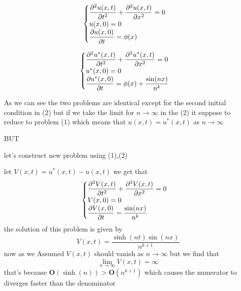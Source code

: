 \documentclass[]{article}
\begin{document}
\begin{minipage}{.5\textwidth}
        \begin{equation}
                \begin{cases}
                        \displaystyle \pdv[2]{u(x,t)}{t} + \pdv[2]{u(x,t)}{x} = 0
                        \\
                        u(x,0) = 0
                        \\
                        \displaystyle \pdv{u(x,0)}{t} = \phi(x)
                \end{cases}        
        \end{equation}
\end{minipage}
\begin{minipage}{.5\textwidth}
        \begin{equation}
                \begin{cases}
                        \displaystyle \pdv[2]{u^{*}(x,t)}{t} + \pdv[2]{u^{*}(x,t)}{x} = 0
                        \\
                        u^{*}(x,0) = 0
                        \\
                        \displaystyle \pdv{u^{*}(x,0)}{t} = \phi(x) + \frac{\sin(nx)}{n^{k}}
                \end{cases}               
        \end{equation}
\end{minipage}


As we can see the two problems are identical except for the second initial condition in (2) but if we take the 
limit for $n \to \infty$ in the (2) it suppose to reduce to problem (1) which means that $u(x,t) = u^{*}(x,t)$ as $n \to \infty$

BUT

let's construct new problem using (1),(2)

let $V(x,t) = u^{*}(x,t) - u(x,t)$ we get that 
\begin{equation}
        \begin{cases}
                \displaystyle \pdv[2]{V(x,t)}{t} + \pdv[2]{V(x,t)}{x} = 0
                \\
                V(x,0) = 0
                \\
                \displaystyle \pdv{V(x,0)}{t} =\frac{\sin(nx)}{n^{k}}
        \end{cases}               
\end{equation}
the solution of this problem is given by 
\[
V(x,t) = \frac{\sinh(nt)\sin(nx)}{n^{k+1}}
\]
now as we Assumed $V(x,t)$ should vanish as $n \to \infty$ but we find that 
\[
\lim_{n \to \infty} V(x,t) = \infty
\]
that's because $\mathbf{O}(\sinh(n)) > \mathbf{O}(n^{k+1})$ which causes the numerator to diverges faster than the denominator
\setcounter{equation}{0}
\end{document}
